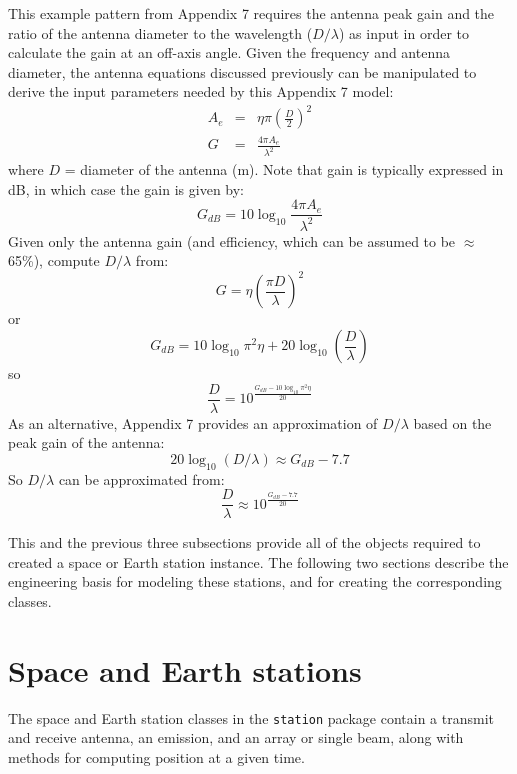 \documentclass[11pt]{article}
\begin{document}
This example pattern from Appendix 7 requires the antenna peak gain
and the ratio of the antenna diameter to the wavelength ($D/\lambda$)
as input in order to calculate the gain at an off-axis angle.  Given
the frequency and antenna diameter, the antenna equations discussed
previously can be manipulated to derive the input parameters needed by
this Appendix 7 model:
\begin{eqnarray}
  A_e &=& \eta\pi\left(\frac{D}{2}\right)^2 \\
  G &=& \frac{4\pi A_e}{\lambda^2}
\end{eqnarray}
where $D$ = diameter of the antenna (m). Note that gain is typically
expressed in dB, in which case the gain is given by:
\begin{equation}
  G_{dB} = 10\log_{10}\frac{4\pi A_e}{\lambda^2}
\end{equation}
Given only the antenna gain (and efficiency, which can be assumed to
be $\approx$ 65\%), compute $D/\lambda$ from:
\begin{equation}
  G = \eta\left(\frac{\pi D}{\lambda}\right)^2
\end{equation}
or
\begin{equation}
  G_{dB} = 10\log_{10}\pi^2\eta + 20\log_{10}\left(\frac{D}{\lambda}\right)
\end{equation}
so
\begin{equation}
  \frac{D}{\lambda} = 10^{\frac{G_{dB} - 10\log_{10}\pi^2\eta}{20}}
\end{equation}
As an alternative, Appendix 7 provides an approximation of $D/\lambda$
based on the peak gain of the antenna:
\begin{equation}
  20\log_{10}(D/\lambda) \approx G_{dB} - 7.7
\end{equation}
So $D/\lambda$ can be approximated from:
\begin{equation}
  \frac{D}{\lambda} \approx 10^{\frac{G_{dB} - 7.7}{20}}
\end{equation}

This and the previous three subsections provide all of the objects
required to created a space or Earth station instance. The
following two sections describe the engineering basis for modeling
these stations, and for creating the corresponding classes.

\section{Space and Earth stations}

The space and Earth station classes in the \texttt{\small station} package
contain a transmit and receive antenna, an emission, and an array or
single beam, along with methods for computing position at a given
time.
\end{document}
